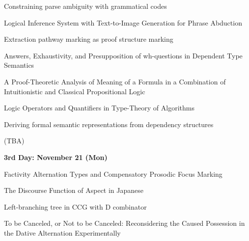 \documentclass[12pt]{jarticle}
\begin{document}
      {Constraining parse ambiguity with grammatical codes}
      {}




  
      {Logical Inference System with Text-to-Image Generation for Phrase Abduction}
      {}
  
      {Extraction pathway marking as proof structure marking}
      {}
  
      {Answers, Exhaustivity, and Presupposition of wh-questions in Dependent Type Semantics}
      {}




  
      {A Proof-Theoretic Analysis of Meaning of a Formula in a Combination of Intuitionistic and Classical Propositional Logic}
      {}
  
      {Logic Operators and Quantifiers in Type-Theory of Algorithms}
      {}
  
      {Deriving formal semantic representations from dependency structures}
      {}




  
      {(TBA)}
      {}




\noindent\textbf{\large 
3rd Day: November 21 (Mon)
}\\




  
      {Factivity Alternation Types and Compensatory Prosodic Focus Marking}
      {}
  
      {The Discourse Function of Aspect in Japanese}
      {}
  
      {Left-branching tree in CCG with D combinator}
      {}




  
      {To be Canceled, or Not to be Canceled: Reconsidering the Caused Possession in the Dative Alternation Experimentally}
      {}
  
\end{document}
